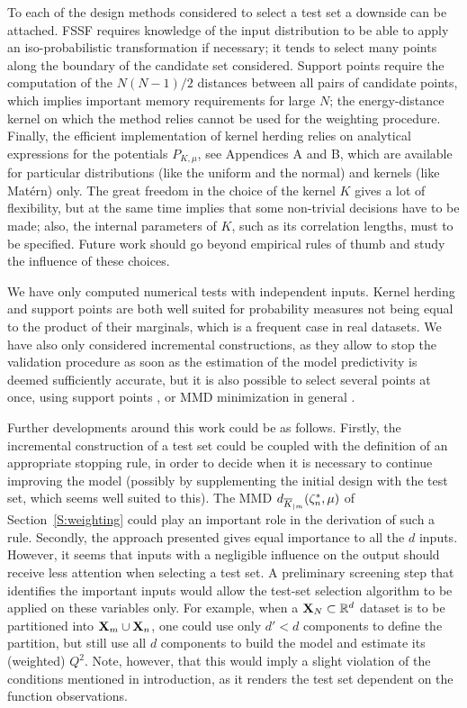 To each of the design methods considered to select a test set a downside can be attached. FSSF requires knowledge of the input distribution to be able to apply an iso-probabilistic transformation if necessary; it tends to select many points along the boundary of the candidate set considered. 
Support points require the computation of the $N(N-1)/2$ distances between all pairs of candidate points, which implies important memory requirements for large $N$; the energy-distance kernel on which the method relies cannot be used for the weighting procedure. 
Finally, the efficient implementation of kernel herding relies on  analytical expressions for the potentials $P_{K,\mu}$, see Appendices A and B, which are available for particular distributions (like the uniform and the normal) and kernels (like Matérn) only. 
The great freedom in the choice of the kernel $K$ gives a lot of flexibility, but at the same time implies that some non-trivial decisions have to be made; also, the internal parameters of $K$, such as its correlation lengths, must to be specified. 
Future work should go beyond empirical rules of thumb and study the influence of these choices.

We have only computed numerical tests with independent inputs. 
Kernel herding and support points are both well suited for probability measures not being equal to the product of their marginals, which is a frequent case in real datasets.
We have also only considered incremental constructions, as they allow to stop the validation procedure as soon as the estimation of the model predictivity is deemed sufficiently accurate, but it is also possible to select several points at once, using support points \cite{makjos18}, or MMD minimization in general \cite{TeymurGRO2021}. 

Further developments around this work could be as follows. 
Firstly, the incremental construction of a test set could be coupled with the definition of an appropriate stopping rule, in order to decide when  it is  necessary to continue improving the model (possibly by supplementing the initial design with the test set, which seems well suited to this). 
The MMD $d_{\overline{K}_{|m}}(\zeta_n^*,\mu)$ of Section~\ref{S:weighting} could play an important role in the derivation of such a rule. 
Secondly, the approach presented gives equal importance to all the $d$ inputs.
However, it seems that inputs with a negligible influence on the output should receive less attention when selecting a test set. 
A preliminary screening step that identifies the important inputs would allow the test-set selection algorithm to be applied on these variables only. 
For example, when a ${\bf X}_N\subset\mathbb{R}^d$ dataset is to be partitioned into ${\bf X}_m\cup{\bf X}_n$, one could use only $d'<d$ components to define the partition, but still use all $d$ components to build the model and estimate its (weighted) $Q^2$. 
Note, however, that this would imply a slight violation of the conditions mentioned in introduction, as it renders the test set dependent on the function observations.

